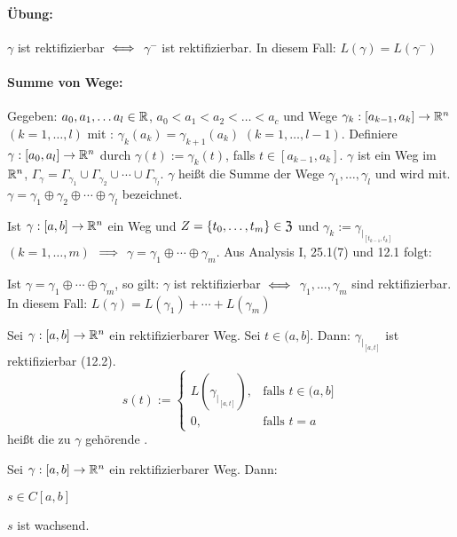 \documentclass[a4paper,twoside,DIV15,BCOR12mm]{scrbook}
\begin{document}
\paragraph{Übung:} $\gamma$ ist rektifizierbar $\iff$ $\gamma^-$ ist rektifizierbar. In diesem Fall: \mbox{$L(\gamma) = L(\gamma^-)$}

\paragraph{Summe von Wege:}Gegeben: $a_0, a_1,\ldots a_l \in \mathbb{R}$, $a_0<a_1<a_2<\ldots<a_c$ und Wege $\gamma_k:[a_{k-1},a_k] \to \mathbb{R}^n$ $(k=1,\ldots,l)$ mit : $\gamma_k(a_k) = \gamma_{k+1}(a_k)$ $(k=1,\ldots,l-1)$.
Definiere $\gamma:[a_0,a_l]\to\mathbb{R}^n$ durch $\gamma(t):=\gamma_k(t)$, falls $t\in[a_{k-1},a_k]$. $\gamma$ ist ein Weg im $\mathbb{R}^n$, $\Gamma_\gamma = \Gamma_{\gamma_1} \cup \Gamma_{\gamma_2} \cup \cdots \cup \Gamma_{\gamma_l}$. $\gamma$ heißt die Summe der Wege $\gamma_1,\ldots,\gamma_l$ und wird mit. $\gamma = \gamma_1 \oplus \gamma_2 \oplus \cdots \oplus \gamma_l$ bezeichnet. 

\begin{bemerkung}
Ist $\gamma:[a,b]\to\mathbb{R}^n$ ein Weg und $Z=\{t_0,\ldots,t_m\}\in\mathfrak{Z}$ und $\gamma_k:=\gamma_{|_{[t_{k-1},t_k]}}$ $(k=1,\ldots,m)$ $\implies$ $\gamma = \gamma_1 \oplus \cdots \oplus \gamma_m$. Aus Analysis I, 25.1(7) und 12.1 folgt: 
\end{bemerkung}

\begin{satz}
Ist $\gamma = \gamma_1 \oplus \cdots \oplus \gamma_m$, so gilt: $\gamma$ ist rektifizierbar $\iff$ $\gamma_1,\ldots,\gamma_m$ sind rektifizierbar. In diesem Fall: $L(\gamma)=L(\gamma_1) + \cdots + L(\gamma_m)$
\end{satz}

\begin{definition}
Sei $\gamma:[a,b]\to\mathbb{R}^n$ ein rektifizierbarer Weg. Sei $t\in(a,b]$. Dann: $\gamma_{|_{[a,t]}}$ ist rektifizierbar (12.2).
$$s(t):= \begin{cases}L(\gamma_{|_{[a,t]}}),&\text{falls }t\in(a,b] \\0, &\text{falls }t=a\end{cases}$$ heißt die zu $\gamma$ gehörende .
\end{definition}

\begin{satz}
Sei $\gamma:[a,b]\to\mathbb{R}^n$ ein rektifizierbarer Weg. Dann: 
\begin{liste}
\item $s\in C[a,b]$
\item $s$ ist wachsend.
\end{liste}
\end{satz}
\end{document}
